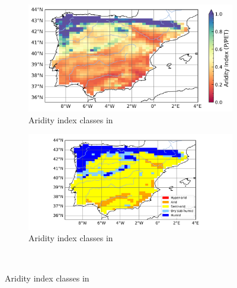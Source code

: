 \begin{figure}[htbp]
    \centering
    \begin{subfigure}[b]{0.42\textwidth}
        \caption{Aridity index classes in \presnoirr}
        \includegraphics[width=\textwidth]{images/chap4/future/map_AI_pres_noirr.png}
    \end{subfigure}
    \begin{subfigure}[b]{0.48\textwidth}
        \caption{Aridity index classes in \presnoirr}
        \includegraphics[width=\textwidth]{images/chap4/future/aridity_index_pres_noirr.png}
    \end{subfigure} \\


\end{figure}
